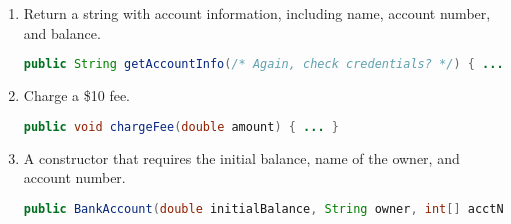 \documentclass[leqno, 11pt]{article}
\begin{document}
\begin{enumerate}
\begin{enumerate}[label=\alph*.]
\begin{enumerate}[label=\roman*.]
\begin{lstlisting}[language=java, xleftmargin=0.06\textwidth]
                        \end{lstlisting}
                  \item Return a string with account information, including name, account number, and balance.
                        \begin{lstlisting}[language=java, xleftmargin=0.05\textwidth]
public String getAccountInfo(/* Again, check credentials? */) { ... }
                        \end{lstlisting}
                  \item Charge a \$10 fee.
                        \begin{lstlisting}[language=java, xleftmargin=0.18\textwidth]
public void chargeFee(double amount) { ... }
                        \end{lstlisting}
                  \item A constructor that requires the initial balance, name of the owner, and account number.
                        \begin{lstlisting}[language=java, xleftmargin=0.01\textwidth]
public BankAccount(double initialBalance, String owner, int[] acctNumber) { ... }
                        \end{lstlisting}
                \end{enumerate}
        \end{enumerate}
\end{enumerate}
\end{document}

